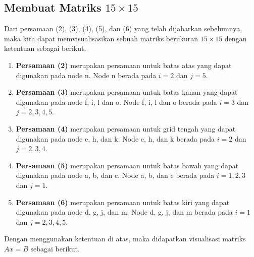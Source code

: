 \documentclass{article}
\begin{document}
\subsection{Membuat Matriks \(15 \times 15\)}
Dari persamaan (2), (3), (4), (5), dan (6) yang telah dijabarkan  sebelumnya, maka kita dapat memvisualisasikan sebuah matriks berukuran \(15 \times 15 \) dengan ketentuan sebagai berikut.
\begin{enumerate}
    \item \textbf{Persamaan (2)} merupakan persamaan untuk batas atas yang dapat digunakan pada node n. Node n berada pada \(i=2\) dan \(j=5\).
    \item \textbf{Persamaan (3)} merupakan persamaan untuk batas kanan yang dapat digunakan pada node f, i, l dan o. Node f, i, l dan o berada pada \(i=3\) dan \(j=2,3,4,5\).
    \item \textbf{Persamaan (4)} merupakan persamaan untuk grid tengah yang dapat digunakan pada node e, h, dan k. Node e, h, dan k berada pada \(i=2\) dan \(j=2,3,4\).
    \item \textbf{Persamaan (5)} merupakan persamaan untuk batas bawah yang dapat digunakan pada node a, b, dan c. Node a, b, dan c berada pada \(i=1,2,3\) dan \(j=1\).
    \item \textbf{Persamaan (6)} merupakan persamaan untuk batas kiri yang dapat digunakan pada node d, g, j, dan m. Node d, g, j, dan m berada pada \(i=1\) dan \(j=2,3,4,5\).
\end{enumerate}

Dengan menggunakan ketentuan di atas, maka didapatkan visualisasi matriks \(Ax=B\) sebagai berikut.
\end{document}

